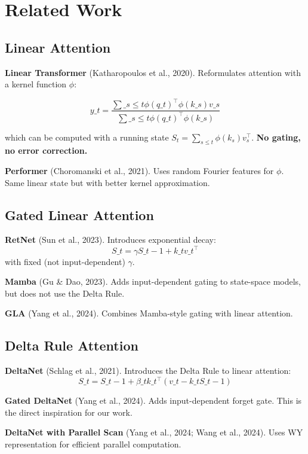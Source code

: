 
\section{Related Work}

\subsection{Linear Attention}

\textbf{Linear Transformer} (Katharopoulos et al., 2020). Reformulates attention 
with a kernel function $\phi$:

\[
y\_t = \frac{\sum\_{s \leq t} \phi(q\_t)^\top \phi(k\_s) v\_s}{\sum\_{s \leq t} \phi(q\_t)^\top \phi(k\_s)}
\tag{2.1}
\]

which can be computed with a running state $S_t = \sum_{s \leq t} \phi(k_s) v_s^\top$. 
\textbf{No gating, no error correction.}

\textbf{Performer} (Choromanski et al., 2021). Uses random Fourier features for 
$\phi$. Same linear state but with better kernel approximation.

\subsection{Gated Linear Attention}

\textbf{RetNet} (Sun et al., 2023). Introduces exponential decay:
\[
S\_t = \gamma S\_{t-1} + k\_t v\_t^\top
\tag{2.2}
\]
with fixed (not input-dependent) $\gamma$.

\textbf{Mamba} (Gu \& Dao, 2023). Adds input-dependent gating to state-space models, 
but does not use the Delta Rule.

\textbf{GLA} (Yang et al., 2024). Combines Mamba-style gating with linear attention.

\subsection{Delta Rule Attention}

\textbf{DeltaNet} (Schlag et al., 2021). Introduces the Delta Rule to linear 
attention:
\[
S\_t = S\_{t-1} + \beta\_t k\_t^\top (v\_t - k\_t S\_{t-1})
\tag{2.3}
\]

\textbf{Gated DeltaNet} (Yang et al., 2024). Adds input-dependent forget gate. 
This is the direct inspiration for our work.

\textbf{DeltaNet with Parallel Scan} (Yang et al., 2024; Wang et al., 2024). Uses 
WY representation for efficient parallel computation.

